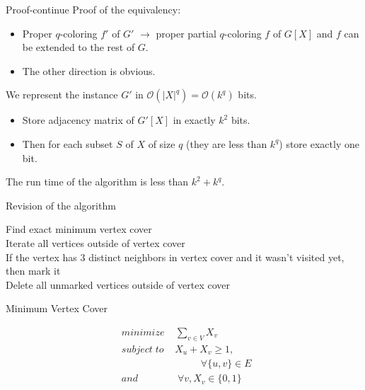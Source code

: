 \documentclass{beamer}
\begin{document}
\begin{frame}{Proof-continue}
Proof of the equivalency: 
 
\begin{itemize}

\item Proper $q$-coloring $f'$ of $G'$ $\longrightarrow$ proper partial $q$-coloring $f$ of $G[X]$ 
and $f$ can be extended to the rest of $G$.
 
\item The other direction is obvious.


\end{itemize}
 
We represent the instance $G'$ in $\mathcal{O}(|X|^q) = \mathcal{O}(k^q)$ bits.
 
\begin{itemize}
\item Store adjacency matrix of $G'[X]$ in exactly $k^2$ bits. 
 
\item Then for each subset $S$ of $X$ of size $q$ (they are less than $k^q$) store exactly one bit. 
\end{itemize}
 
The run time of the algorithm is less than $k^2 + k^q$.
\end{frame}

\begin{frame}{Revision of the algorithm}

\begin{algorithm}[H]
\begin{algorithmic}[1]
\SetAlgoLined
\DontPrintSemicolon
  \caption{Kernelization of vertex coloring by using vertex cover}
 
\STATE Find exact minimum vertex cover\\
 
\STATE Iterate all vertices outside of vertex cover\\
 
\STATE If the vertex has $3$ distinct neighbors in vertex cover and it wasn't
visited yet, then mark it\\
 
\STATE Delete all unmarked vertices outside of vertex cover\\
\end{algorithmic}
\end{algorithm}
\end{frame}


\begin{frame}{Minimum Vertex Cover}
 
\begin{align*}
&minimize \; \;\; \; \sum_{v\in V}X_v \\
&subject\; to \;\;\; \; X_u + X_v  \geq 1 , \qquad \\
&\qquad 	\qquad\qquad\qquad	 \forall \{u,v\} \in E\\
&and	\qquad\qquad	 \forall v, X_v\in \{0,1\}
\end{align*}
\end{frame}
\end{document}
